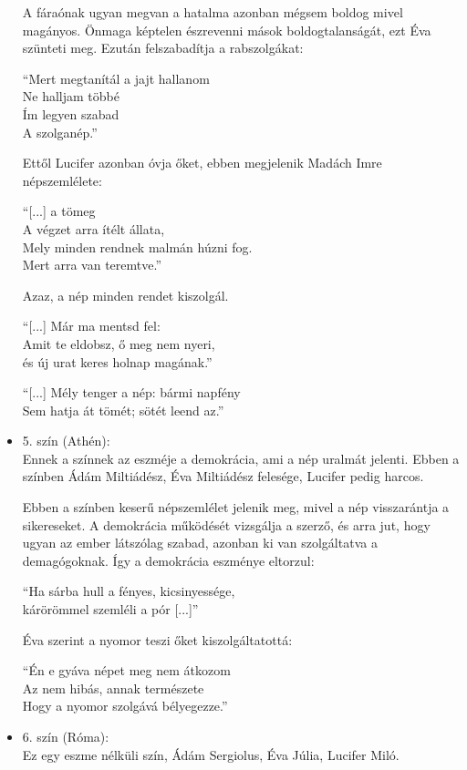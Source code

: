 \documentclass[]{article}
\begin{document}
\begin{itemize}
			A fáraónak ugyan megvan a hatalma azonban mégsem boldog mivel magányos. Önmaga képtelen észrevenni mások boldogtalanságát, ezt Éva szünteti meg. Ezután felszabadítja a rabszolgákat:
			\begin{displayquote}
				\enquote{Mert megtanítál a jajt hallanom\\
				Ne halljam többé\\
				Ím legyen szabad\\
				A szolganép.}
			\end{displayquote}
			Ettől Lucifer azonban óvja őket, ebben megjelenik Madách Imre népszemlélete:
			\begin{displayquote}
				\enquote{[...] a tömeg\\
				A végzet arra ítélt állata,\\
				Mely minden rendnek malmán húzni fog.\\
				Mert arra van teremtve.}
			\end{displayquote}
			Azaz, a nép minden rendet kiszolgál.
			\begin{displayquote}
				\enquote{[...] Már ma mentsd fel:\\
				Amit te eldobsz, ő meg nem nyeri,\\
				és új urat keres holnap magának.}
			\end{displayquote}
			\begin{displayquote}
				\enquote{[...] Mély tenger a nép: bármi napfény\\
				Sem hatja át tömét; sötét leend az.}
			\end{displayquote}
		\item 5. szín (Athén):\\
			Ennek a színnek az eszméje a demokrácia, ami a nép uralmát jelenti. Ebben a színben Ádám Miltiádész, Éva Miltiádész felesége, Lucifer pedig harcos.
			
			Ebben a színben keserű népszemlélet jelenik meg, mivel a nép visszarántja a sikereseket. A demokrácia működését vizsgálja a szerző, és arra jut, hogy ugyan az ember látszólag szabad, azonban ki van szolgáltatva a demagógoknak. Így a demokrácia eszménye eltorzul:
			\begin{displayquote}
				\enquote{Ha sárba hull a fényes, kicsinyessége,\\
					kárörömmel szemléli a pór [...]}
			\end{displayquote}
		 	Éva szerint a nyomor teszi őket kiszolgáltatottá:
		 	\begin{displayquote}
		 		\enquote{Én e gyáva népet meg nem átkozom\\
		 		Az nem hibás, annak természete\\
	 			Hogy a nyomor szolgává bélyegezze.}
		 	\end{displayquote}
	 	\item 6. szín (Róma):\\
	 		Ez egy eszme nélküli szín, Ádám Sergiolus, Éva Júlia, Lucifer Miló.
	 		

\end{itemize}
\end{document}
